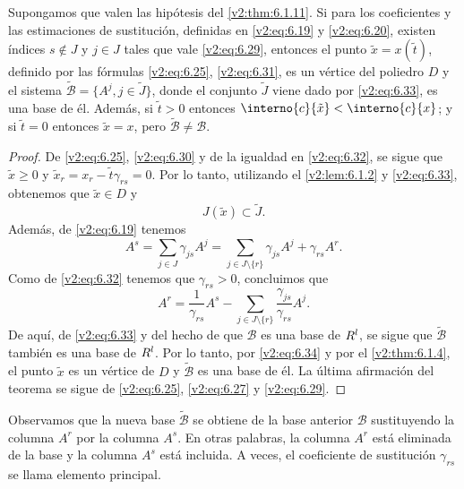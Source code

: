 \begin{theorem}\label{v2:thm:6.1.13}
    Supongamos que valen las hipótesis del \cref{v2:thm:6.1.11}. Si para los coeficientes y las estimaciones de sustitución, definidas en \eqref{v2:eq:6.19} y \eqref{v2:eq:6.20}, existen índices $s \notin J$ y $j \in J$ tales que vale \eqref{v2:eq:6.29}, entonces el punto $\tilde{x} = x(\tilde{t})$, definido por las fórmulas \eqref{v2:eq:6.25}, \eqref{v2:eq:6.31}, es un vértice del poliedro $D$ y el sistema $\tilde{\mathcal{B}} = \{ A^j, j \in \tilde{J} \}$, donde el conjunto $\tilde{J}$ viene dado por \eqref{v2:eq:6.33}, es una base de él. Además, si $\tilde{t} > 0$ entonces $\interno{c}{\tilde{x}} < \interno{c}{x}$; y si $\tilde{t} = 0$ entonces $\tilde{x} = x$, pero $\tilde{\mathcal{B}} \neq \mathcal{B}$.
\end{theorem}

\begin{proof}
    De \eqref{v2:eq:6.25}, \eqref{v2:eq:6.30} y de la igualdad en \eqref{v2:eq:6.32}, se sigue que $\tilde{x} \ge 0$ y $\tilde{x}_r = x_r - \tilde{t}\gamma_{rs} = 0$. Por lo tanto, utilizando el \cref{v2:lem:6.1.2} y \eqref{v2:eq:6.33}, obtenemos que $\tilde{x} \in D$ y
    \begin{equation}
        J(\tilde{x}) \subset \tilde{J}.
        \label{v2:eq:6.34}
    \end{equation}
    Además, de \eqref{v2:eq:6.19} tenemos
    \[
        A^s = \sum_{j \in J} \gamma_{js} A^j = \sum_{j \in J \setminus \{r\}} \gamma_{js} A^j + \gamma_{rs} A^r.
    \]
    Como de \eqref{v2:eq:6.32} tenemos que $\gamma_{rs} > 0$, concluimos que
    \begin{equation}
        A^r = \frac{1}{\gamma_{rs}} A^s - \sum_{j \in J \setminus \{r\}} \frac{\gamma_{js}}{\gamma_{rs}} A^j.
        \label{v2:eq:6.35}
    \end{equation}
    De aquí, de \eqref{v2:eq:6.33} y del hecho de que $\mathcal{B}$ es una base de $R^l$, se sigue que $\tilde{\mathcal{B}}$ también es una base de $R^l$. Por lo tanto, por \eqref{v2:eq:6.34} y por el \cref{v2:thm:6.1.4}, el punto $\tilde{x}$ es un vértice de $D$ y $\tilde{\mathcal{B}}$ es una base de él.
    La última afirmación del teorema se sigue de \eqref{v2:eq:6.25}, \eqref{v2:eq:6.27} y \eqref{v2:eq:6.29}.
\end{proof}

Observamos que la nueva base $\tilde{\mathcal{B}}$ se obtiene de la base anterior $\mathcal{B}$ sustituyendo la columna $A^r$ por la columna $A^s$. En otras palabras, la columna $A^r$ está eliminada de la base y la columna $A^s$ está incluida. A veces, el coeficiente de sustitución $\gamma_{rs}$ se llama elemento principal.

